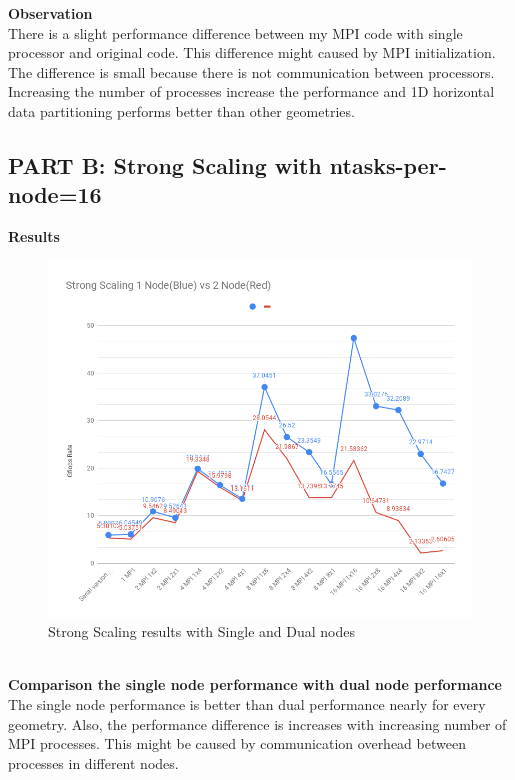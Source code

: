 \documentclass{article}
\newcommand\tab[1][0.5cm]{\hspace*{#1}}
\begin{document}
\textbf{Observation}
\\ \tab There is a slight performance difference between my MPI code with single processor and original code. This difference might caused by MPI initialization. The difference is small because there is not communication between processors.
\\ \tab Increasing the number of processes increase the performance and 1D horizontal data partitioning performs better than other geometries.

\newpage


\subsection{PART B: Strong Scaling with ntasks-per-node=16}
	
\textbf{Results}
\begin{figure}[!htb]
    \centering
    \includegraphics[width=1\linewidth]{./img/1vs2.png}
    \caption{Strong Scaling results with Single and Dual nodes}
\end{figure}  
\\ 
\textbf{Comparison the single node performance with dual node performance}
The single node performance is better than dual performance nearly for every geometry. Also, the performance difference is increases with increasing number of MPI processes. This might be caused by communication overhead between processes in different nodes.

\newpage
\end{document}
